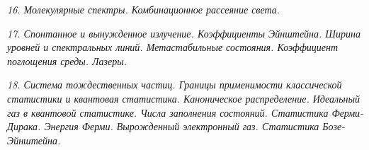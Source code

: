 \emph{16. Молекулярные спектры. Комбинационное рассеяние света.}

\newpage %

\emph{17. Спонтанное и вынужденное излучение. Коэффициенты Эйнштейна. 
Ширина уровней и спектральных линий. Метастабильные состояния. 
Коэффициент поглощения среды. Лазеры.}

\newpage %

\emph{18. Система тождественных частиц. Границы применимости классической 
статистики и квантовая статистика. Каноническое распределение. 
Идеальный газ в квантовой статистике. Числа заполнения состояний. 
Статистика Ферми-Дирака. Энергия Ферми. Вырожденный электронный газ. 
Статистика Бозе-Эйнштейна.}

